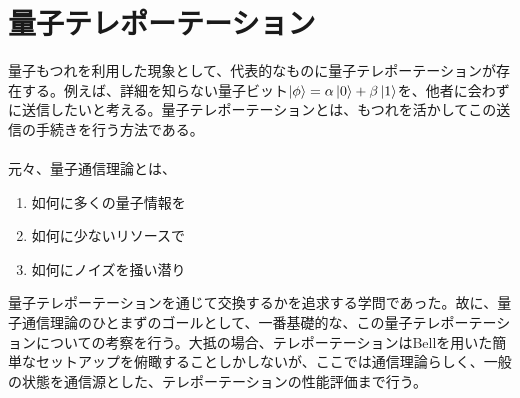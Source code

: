 \documentclass[a4paper,10.5pt]{article}
\numberwithin{equation}{section}
\begin{document}
\section{量子テレポーテーション}
量子もつれを利用した現象として、代表的なものに量子テレポーテーションが存在する。例えば、詳細を知らない量子ビット$\ket{\phi}=\alpha \ket{0}+\beta \ket{1}$を、他者に会わずに送信したいと考える。量子テレポーテーションとは、もつれを活かしてこの送信の手続きを行う方法である。\\
\\
元々、量子通信理論とは、
\begin{enumerate}
    \item 如何に多くの量子情報を
    \item 如何に少ないリソースで
    \item 如何にノイズを掻い潜り
\end{enumerate}
量子テレポーテーションを通じて交換するかを追求する学問であった。故に、量子通信理論のひとまずのゴールとして、一番基礎的な、この量子テレポーテーションについての考察を行う。大抵の場合、テレポーテーションはBellを用いた簡単なセットアップを俯瞰することしかしないが、ここでは通信理論らしく、一般の状態を通信源とした、テレポーテーションの性能評価まで行う。
\end{document}
